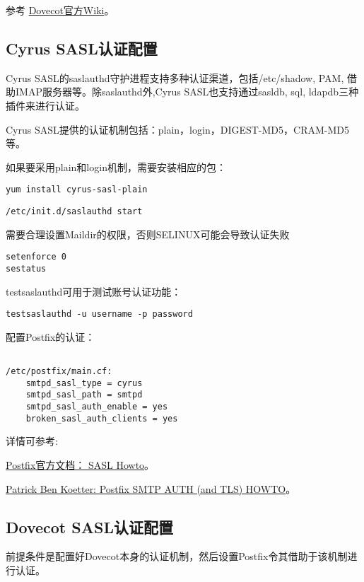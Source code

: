 参考
\href{http://wiki2.dovecot.org/}{Dovecot官方Wiki}。




\subsection{Cyrus SASL认证配置}


Cyrus SASL的saslauthd守护进程支持多种认证渠道，包括/etc/shadow, PAM,
借助IMAP服务器等。除saslauthd外,Cyrus SASL也支持通过sasldb, sql, ldapdb三种插件来进行认证。

Cyrus SASL提供的认证机制包括：plain，login，DIGEST-MD5，CRAM-MD5等。

如果要采用plain和login机制，需要安装相应的包：
\begin{verbatim}
yum install cyrus-sasl-plain
\end{verbatim}



\begin{verbatim}
/etc/init.d/saslauthd start
\end{verbatim}

需要合理设置Maildir的权限，否则SELINUX可能会导致认证失败
\begin{verbatim}
setenforce 0
sestatus
\end{verbatim}



testsaslauthd可用于测试账号认证功能：
\begin{verbatim}
testsaslauthd -u username -p password
\end{verbatim}

配置Postfix的认证：
\begin{verbatim}

/etc/postfix/main.cf:
	smtpd_sasl_type = cyrus 
	smtpd_sasl_path = smtpd
    smtpd_sasl_auth_enable = yes
    broken_sasl_auth_clients = yes

\end{verbatim}


详情可参考:

\href{http://www.postfix.org/SASL_README.html}{Postfix官方文档： SASL Howto}。

\href{http://postfix.state-of-mind.de/patrick.koetter/smtpauth/index.html}{Patrick Ben Koetter: Postfix SMTP AUTH (and TLS) HOWTO}。



\subsection{Dovecot SASL认证配置}
前提条件是配置好Dovecot本身的认证机制，然后设置Postfix令其借助于该机制进行认证。


